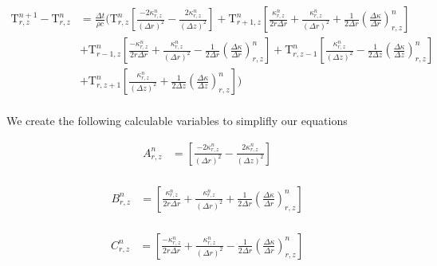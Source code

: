 \documentclass[12pt]{article}
\begin{document}
		\begin{equation}
		\begin{aligned}
		\mathrm{T}^{n+1}_{r, z} - \mathrm{T}^{n}_{r, z} &= \frac{\Delta t}{\rho c}(\mathrm{T}^{n}_{r, z} \left [\frac{-2\kappa^n_{r, z}}{(\Delta r)^2} -\frac{2\kappa^n_{r, z}}{(\Delta z)^2}  \right ] + \mathrm{T}^{n}_{r + 1, z} \left [\frac{\kappa^n_{r, z}}{2r\Delta r} + \frac{\kappa^n_{r, z}}{(\Delta r)^2} + \frac{1}{2\Delta r}(\frac{\Delta\kappa}{\Delta r})^n_{r, z} \right ] \\
		&+ \mathrm{T}^{n}_{r - 1, z} \left [\frac{-\kappa^n_{r, z}}{2r\Delta r} + \frac{\kappa^n_{r, z}}{(\Delta r)^2} - \frac{1}{2\Delta r}(\frac{\Delta\kappa}{\Delta r})^n_{r, z} \right ] + \mathrm{T}^{n}_{r, z - 1} \left [\frac{\kappa^n_{r, z}}{(\Delta z)^2} - \frac{1}{2\Delta z}(\frac{\Delta\kappa}{\Delta z})^n_{r, z}  \right ] \\
		&+ \mathrm{T}^{n}_{r, z + 1} \left [ \frac{\kappa^n_{r, z}}{(\Delta z)^2} + \frac{1}{2\Delta z}(\frac{\Delta\kappa}{\Delta z})^n_{r, z} \right ]) \\
		\end{aligned}
		\end{equation}
		
    We create the following calculable variables to simplifly our equations

		\begin{equation}
		\begin{aligned}
		A^n_{r, z} &= \left [\frac{-2\kappa^n_{r, z}}{(\Delta r)^2} -\frac{2\kappa^n_{r, z}}{(\Delta z)^2}  \right ] \\
		\end{aligned}
		\end{equation}
		
		\begin{equation}
		\begin{aligned}
		B^n_{r, z} &= \left [\frac{\kappa^n_{r, z}}{2r\Delta r} + \frac{\kappa^n_{r, z}}{(\Delta r)^2} + \frac{1}{2\Delta r}(\frac{\Delta\kappa}{\Delta r})^n_{r, z} \right ] \\
		\end{aligned}
		\end{equation}
		
		\begin{equation}
		\begin{aligned}
		C^n_{r, z} &= \left [\frac{-\kappa^n_{r, z}}{2r\Delta r} + \frac{\kappa^n_{r, z}}{(\Delta r)^2} - \frac{1}{2\Delta r}(\frac{\Delta\kappa}{\Delta r})^n_{r, z} \right ] \\
		\end{aligned}
		\end{equation}
		
\end{document}

